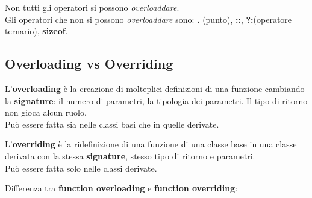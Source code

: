 \textsf{\small Non tutti gli operatori si possono \emph{overloaddare}.} \\

\textsf{\small Gli operatori che non si possono \emph{overloaddare} sono: \textbf{.} (punto), \textbf{::}, \textbf{?:}(operatore ternario), \textbf{sizeof}.} \\

\subsection{Overloading vs Overriding}

\textsf{\small L'\textbf{overloading} è la creazione di molteplici definizioni di una funzione cambiando la \textbf{signature}: il numero di parametri, la tipologia dei parametri. Il tipo di ritorno non gioca alcun ruolo.} \\

\textsf{\small Può essere fatta sia nelle classi basi che in quelle derivate.} \break

\textsf{\small L'\textbf{overriding} è la ridefinizione di una funzione di una classe base in una classe derivata con la stessa \textbf{signature}, stesso tipo di ritorno e parametri.} \\

\textsf{\small Può essere fatta solo nelle classi derivate.} \break

\textsf{\small Differenza tra \textbf{function overloading} e \textbf{function overriding}: } \break

